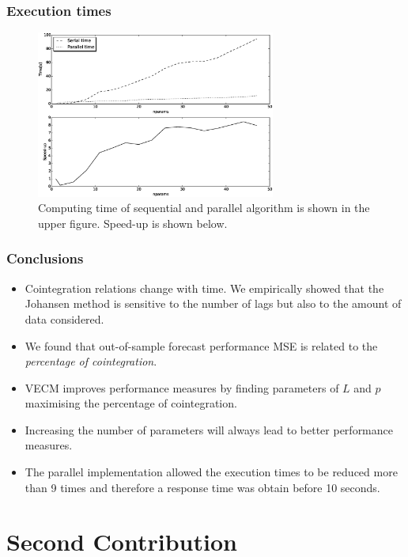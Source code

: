 \documentclass{beamer}
\begin{document}
%
\begin{frame}
\frametitle{Execution times}
\begin{figure}[ht]
  \centering
  \includegraphics[width=0.7\textwidth]{img/51_Fig3}
  \caption[Computing time and Speed-up]{Computing time of sequential and parallel algorithm is shown in the
  upper figure. Speed-up is shown below.}
  \label{fig:extimes}
\end{figure}
\end{frame}

\begin{frame}
\frametitle{Conclusions}
\begin{itemize}
\item Cointegration relations change with time. We empirically showed that the Johansen method is sensitive to the number of lags but also to the amount of data considered.
\item We found that out-of-sample forecast performance MSE is related to the {\em percentage of cointegration\/}.  
\item VECM improves performance measures by finding
parameters of $L$ and $p$ maximising the percentage of cointegration.
\item Increasing the number of parameters will always lead to
better performance measures.
\item The parallel implementation allowed the execution times to be reduced
more than 9 times and therefore a response time was obtain before 10
seconds. 
\end{itemize}
\end{frame}

\section{Second Contribution}
\end{document}
